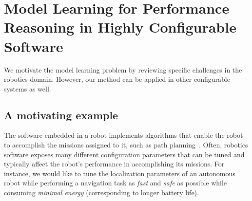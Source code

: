 \section{Model Learning for Performance Reasoning in Highly Configurable Software}
\label{sec:background}

We motivate the model learning problem by reviewing specific challenges in the robotics domain. However, our method can be applied in other configurable systems as well. %

\subsection{A motivating example}
\label{sec:example}

The software embedded in a robot implements algorithms that enable the robot to accomplish the missions assigned to it, such as path planning~\cite{kawthekarsensitivity}. %
Often, robotics software exposes many different configuration parameters that can be tuned and typically affect the robot's performance in accomplishing its missions.
For instance, we would like to tune the localization parameters of an autonomous robot while performing a navigation task as \emph{fast} and \emph{safe} as possible while consuming \emph{minimal energy} (corresponding to longer battery life).

